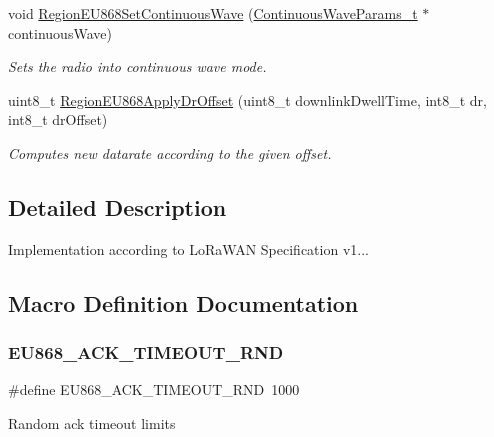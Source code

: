 \begin{DoxyCompactItemize}
void \hyperlink{group__REGIONEU868_gaa7573d0677552b321af04417a58672eb}{Region\+E\+U868\+Set\+Continuous\+Wave} (\hyperlink{group__REGION_gaf39bb5ba06921139c6d17f88a8d518cd}{Continuous\+Wave\+Params\+\_\+t} $\ast$continuous\+Wave)
\begin{DoxyCompactList}\small\item\em Sets the radio into continuous wave mode. \end{DoxyCompactList}\item 
uint8\+\_\+t \hyperlink{group__REGIONEU868_ga30121c63a197681a176717191a4b89cd}{Region\+E\+U868\+Apply\+Dr\+Offset} (uint8\+\_\+t downlink\+Dwell\+Time, int8\+\_\+t dr, int8\+\_\+t dr\+Offset)
\begin{DoxyCompactList}\small\item\em Computes new datarate according to the given offset. \end{DoxyCompactList}\end{DoxyCompactItemize}


\subsection{Detailed Description}
Implementation according to Lo\+Ra\+W\+AN Specification v1... 

\subsection{Macro Definition Documentation}
\mbox{\label{group__REGIONEU868_gaf263a9c127c374ca28a18dee1f63dcf4}} 
\subsubsection{\texorpdfstring{E\+U868\+\_\+\+A\+C\+K\+\_\+\+T\+I\+M\+E\+O\+U\+T\+\_\+\+R\+ND}{EU868\_ACK\_TIMEOUT\_RND}}
{\footnotesize\ttfamily \#define E\+U868\+\_\+\+A\+C\+K\+\_\+\+T\+I\+M\+E\+O\+U\+T\+\_\+\+R\+ND~1000}

Random ack timeout limits \mbox{\label{group__REGIONEU868_ga0d482880b3686526074336cc53d3a711}} 
